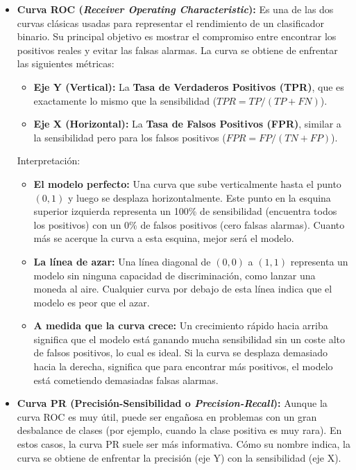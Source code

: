 \begin{itemize}
	\item \textbf{Curva ROC (\textit{Receiver Operating Characteristic}):} Es una de las dos curvas clásicas usadas para representar el rendimiento de un clasificador binario. Su principal objetivo es mostrar el compromiso entre encontrar los positivos reales y evitar las falsas alarmas. La curva se obtiene de enfrentar las siguientes métricas:
	
	\begin{itemize}
		\item \textbf{Eje Y (Vertical):} La \textbf{Tasa de Verdaderos Positivos (TPR)}, que es exactamente lo mismo que la sensibilidad ($TPR = TP/(TP + FN)$).
		
		\item \textbf{Eje X (Horizontal):} La \textbf{Tasa de Falsos Positivos (FPR)}, similar a la sensibilidad pero para los falsos positivos ($FPR = FP/(TN + FP)$).
	\end{itemize}
	
	
	Interpretación:
	
	\begin{itemize}
		\item \textbf{El modelo perfecto:} Una curva que sube verticalmente hasta el punto $(0, 1)$ y luego se desplaza horizontalmente. Este punto en la esquina superior izquierda representa un 100\% de sensibilidad (encuentra todos los positivos) con un 0\% de falsos positivos (cero falsas alarmas). Cuanto más se acerque la curva a esta esquina, mejor será el modelo.
		
		\item \textbf{La línea de azar:} Una línea diagonal de $(0,0)$ a $(1,1)$ representa un modelo sin ninguna capacidad de discriminación, como lanzar una moneda al aire. Cualquier curva por debajo de esta línea indica que el modelo es peor que el azar.
		
		\item \textbf{A medida que la curva crece:} Un crecimiento rápido hacia arriba significa que el modelo está ganando mucha sensibilidad sin un coste alto de falsos positivos, lo cual es ideal. Si la curva se desplaza demasiado hacia la derecha, significa que para encontrar más positivos, el modelo está cometiendo demasiadas falsas alarmas.
	\end{itemize}
	
	\item \textbf{Curva PR (Precisión-Sensibilidad o \textit{Precision-Recall}):} Aunque la curva ROC es muy útil, puede ser engañosa en problemas con un gran desbalance de clases (por ejemplo, cuando la clase positiva es muy rara). En estos casos, la curva PR suele ser más informativa. Cómo su nombre indica, la curva se obtiene de enfrentar la precisión (eje Y) con la sensibilidad (eje X).
	

\end{itemize}
